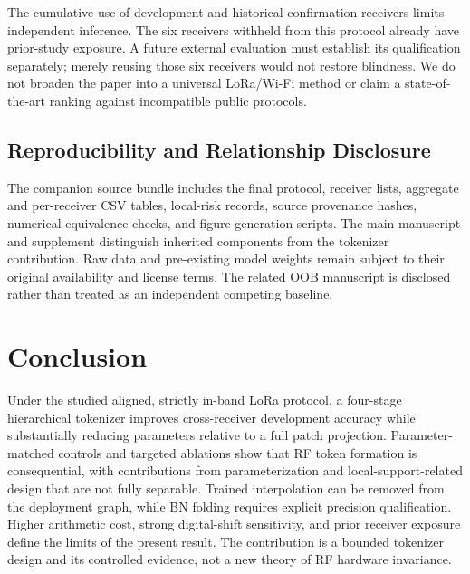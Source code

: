 \documentclass[journal]{IEEEtran}
\begin{document}
The cumulative use of development and historical-confirmation receivers limits independent inference. The six receivers withheld from this protocol already have prior-study exposure. A future external evaluation must establish its qualification separately; merely reusing those six receivers would not restore blindness. We do not broaden the paper into a universal LoRa/Wi-Fi method or claim a state-of-the-art ranking against incompatible public protocols.

\subsection{Reproducibility and Relationship Disclosure}
The companion source bundle includes the final protocol, receiver lists, aggregate and per-receiver CSV tables, local-risk records, source provenance hashes, numerical-equivalence checks, and figure-generation scripts. The main manuscript and supplement distinguish inherited components from the tokenizer contribution. Raw data and pre-existing model weights remain subject to their original availability and license terms. The related OOB manuscript is disclosed rather than treated as an independent competing baseline.

\section{Conclusion}
Under the studied aligned, strictly in-band LoRa protocol, a four-stage hierarchical tokenizer improves cross-receiver development accuracy while substantially reducing parameters relative to a full patch projection. Parameter-matched controls and targeted ablations show that RF token formation is consequential, with contributions from parameterization and local-support-related design that are not fully separable. Trained interpolation can be removed from the deployment graph, while BN folding requires explicit precision qualification. Higher arithmetic cost, strong digital-shift sensitivity, and prior receiver exposure define the limits of the present result. The contribution is a bounded tokenizer design and its controlled evidence, not a new theory of RF hardware invariance.

\balance


\end{document}
